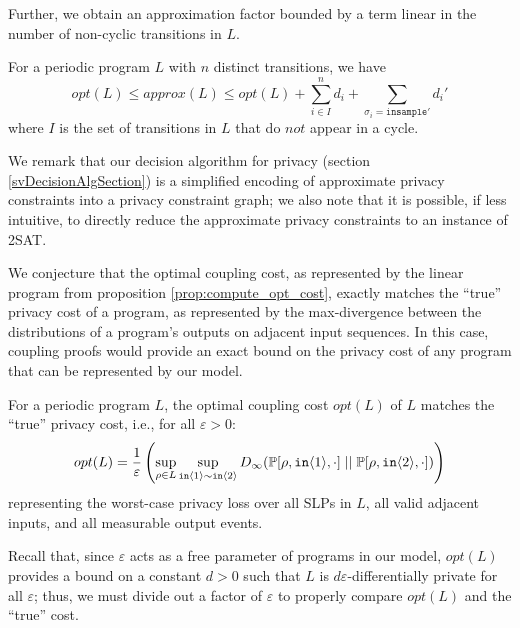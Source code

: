 Further, we obtain an approximation factor bounded by a term linear in the number of non-cyclic transitions in $L$. 

\begin{prop}
    \label{prop:approx_opt_are_close}
    For a periodic program $L$ with $n$ distinct transitions, we have 
    \[opt(L) \leq approx(L) \leq opt(L) + \sum_{i \in I }^n d_i + \sum_{\sigma_i =\texttt{insample}'} d_i'\]
    where $I$ is the set of transitions in $L$ that do $\textit{not}$ appear in a cycle.
\end{prop}

We remark that our decision algorithm for privacy (section \ref{svDecisionAlgSection}) is a simplified encoding of approximate privacy constraints into a privacy constraint graph; we also note that it is possible, if less intuitive, to directly reduce the approximate privacy constraints to an instance of 2SAT. 

We conjecture that the optimal coupling cost, as represented by the linear program from proposition \ref{prop:compute_opt_cost}, exactly matches the ``true'' privacy cost of a program, as represented by the max-divergence between the distributions of a program's outputs on adjacent input sequences. In this case, coupling proofs would provide an exact bound on the privacy cost of any program that can be represented by our model. 

\begin{conj}
    For a periodic program $L$, the optimal coupling cost $opt(L)$ of $L$ matches the ``true'' privacy cost, i.e., for all $\varepsilon>0$:
    \begin{align*}
        opt(L) = \frac{1}{\varepsilon}\left(\sup_{\rho \in L} \sup_{\texttt{in}\langle1 \rangle \sim \texttt{in}\langle2 \rangle} D_\infty(\mathbb{P}[\rho, \texttt{in}\langle1 \rangle, \cdot]\; ||\; \mathbb{P}[\rho, \texttt{in}\langle2 \rangle, \cdot])\right)
    \end{align*}
    representing the worst-case privacy loss over all SLPs in $L$, all valid adjacent inputs, and all measurable output events.
\end{conj}

Recall that, since $\varepsilon$ acts as a free parameter of programs in our model, $opt(L)$ provides a bound on a constant $d>0$ such that $L$ is $d\varepsilon$-differentially private for all $\varepsilon$; thus, we must divide out a factor of $\varepsilon$ to properly compare $opt(L)$ and the ``true'' cost. 
